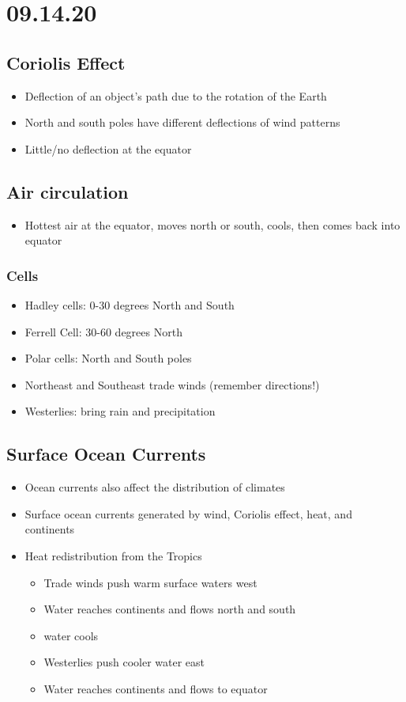 \documentclass[11pt]{article}
\begin{document}
\section{09.14.20}
\label{sec:org7a1b88d}
\subsection{Coriolis Effect}
\label{sec:orgfc2a4cf}
\begin{itemize}
\item Deflection of an object's path due to the rotation of the Earth
\item North and south poles have different deflections of wind patterns
\item Little/no deflection at the equator
\end{itemize}
\subsection{Air circulation}
\label{sec:orgc469376}
\begin{itemize}
\item Hottest air at the equator, moves north or south, cools, then comes back into equator
\end{itemize}
\subsubsection{Cells}
\label{sec:orgdc22bca}
\begin{itemize}
\item Hadley cells: 0-30 degrees North and South
\item Ferrell Cell: 30-60 degrees North
\item Polar cells: North and South poles
\item Northeast and Southeast trade winds (remember directions!)
\item Westerlies: bring rain and precipitation
\end{itemize}
\subsection{Surface Ocean Currents}
\label{sec:org07d4a8e}
\begin{itemize}
\item Ocean currents also affect the distribution of climates
\item Surface ocean currents generated by wind, Coriolis effect, heat, and continents
\item Heat redistribution from the Tropics
\begin{itemize}
\item Trade winds push warm surface waters west
\item Water reaches continents and flows north and south
\item water cools
\item Westerlies push cooler water east
\item Water reaches continents and flows to equator
\end{itemize}
\end{itemize}
\end{document}
